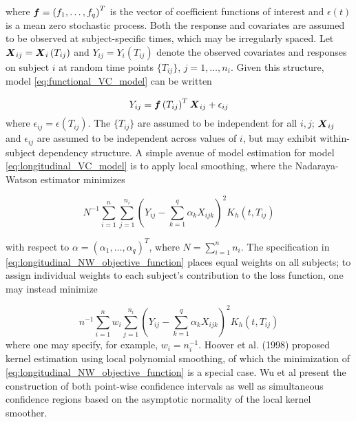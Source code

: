 \documentclass[12pt]{article}
\newcommand{\bff}{\mbox{\boldmath $f$}}
\newcommand{\bfX}{\mbox{\boldmath $X$}}
\begin{document}
where $\bff = \left(f_1,\dots, f_q \right)^T$ is the vector of coefficient functions of interest and $\epsilon\left(t\right)$ is a mean zero stochastic process. Both the response and covariates are assumed to be observed at subject-specific times, which may be irregularly spaced. Let $\bfX_{ij} = \bfX_i\left(T_{ij}\right)$ and $Y_{ij} = Y_i\left(T_{ij}\right)$ denote the observed covariates and responses on subject $i$ at random time points $\lbrace T_{ij} \rbrace$, $j=1,\dots,n_i$. Given this structure, model  \ref{eq:functional_VC_model} can be written 
   
\begin{equation} \label{longitudinal_VC_model}
Y_{ij} = \bff\left(T_{ij}\right)^T\bfX_{ij} + \epsilon_{ij}
\end{equation}
\noindent
where $\epsilon_{ij} = \epsilon\left(T_{ij}\right)$. The $\lbrace T_{ij} \rbrace$ are assumed to be independent for all $i,j$; $\bfX_{ij}$ and $\epsilon_{ij}$ are assumed to be independent across values of $i$, but may exhibit within-subject dependency structure.  A simple avenue of model estimation for model \ref{eq:longitudinal_VC_model} is to apply local smoothing, where the Nadaraya-Watson estimator minimizes 

\begin{equation} \label{eq:longitudinal_NW_objective_function}
N^{-1} \sum_{i=1}^{n} \sum_{j=1}^{n_i} \left(Y_{ij} - \sum_{k=1}^q \alpha_k X_{ijk} \right)^2 K_h\left(t,T_{ij}\right)
\end{equation}
\noindent

with respect to $\alpha = \left(\alpha_1,\dots, \alpha_q \right)^T$, where $N = \sum_{i=1}^n n_i$. The specification in \ref{eq:longitudinal_NW_objective_function} places equal weights on all subjects; to assign individual weights to each subject's contribution to the loss function, one may instead minimize

\begin{equation} \label{eq:longitudinal_NW_objective_function}
n^{-1} \sum_{i=1}^{n} w_i \sum_{j=1}^{n_i} \left(Y_{ij} - \sum_{k=1}^q \alpha_k X_{ijk} \right)^2 K_h\left(t,T_{ij}\right)
\end{equation}
\noindent 
where one may specify, for example, $w_i = n_i^{-1}$. Hoover et al. (1998) proposed kernel estimation using local polynomial smoothing, of which the minimization of \ref{eq:longitudinal_NW_objective_function} is a special case. Wu et al present the construction of both point-wise confidence intervals as well as simultaneous confidence regions based on the asymptotic normality of the local kernel smoother.

 
%

\end{document}

